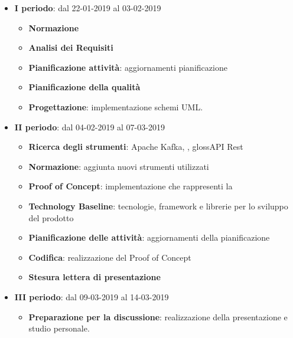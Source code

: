 		\begin{itemize}
			\item \textbf{I periodo}: dal 22-01-2019 al 03-02-2019
			\begin{itemize}
    	        \item \textbf{Normazione}
    	        \item \textbf{Analisi dei Requisiti}
    	        \item \textbf{Pianificazione attività}: aggiornamenti pianificazione
    	        \item \textbf{Pianificazione della qualità}
    	        \item \textbf{Progettazione}: implementazione schemi UML.
        	\end{itemize}
			\item \textbf{II periodo}: dal 04-02-2019 al 07-03-2019
			\begin{itemize}
				\item \textbf{Ricerca degli strumenti}: Apache Kafka, , gloss{API Rest}
    	        \item \textbf{Normazione}: aggiunta nuovi strumenti utilizzati
    	        \item \textbf{Proof of Concept}: implementazione che rappresenti la 
    	        \item \textbf{Technology Baseline}: tecnologie, framework e librerie per lo sviluppo del prodotto
    	        \item \textbf{Pianificazione delle attività}: aggiornamenti della pianificazione
    	        \item \textbf{Codifica}: realizzazione del Proof of Concept
    	        \item \textbf{Stesura lettera di presentazione}
        	\end{itemize}
        	\item \textbf{III periodo}: dal 09-03-2019 al 14-03-2019
			\begin{itemize}
				\item \textbf{Preparazione per la discussione}: realizzazione della presentazione e studio personale.
        	\end{itemize}
		\end{itemize}
        
